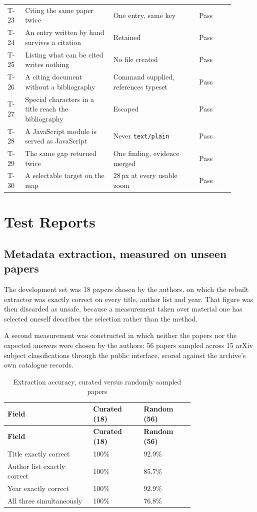 \documentclass[12pt,a4paper]{report}
\begin{document}
\begin{longtable}{@{}p{0.07\linewidth}p{0.35\linewidth}p{0.34\linewidth}p{0.14\linewidth}@{}}
T-23 & Citing the same paper twice & One entry, same key & Pass \\
T-24 & An entry written by hand survives a citation & Retained & Pass \\
T-25 & Listing what can be cited writes nothing & No file created & Pass \\
T-26 & A citing document without a bibliography & Command supplied, references
  typeset & Pass \\
T-27 & Special characters in a title reach the bibliography & Escaped & Pass \\
T-28 & A JavaScript module is served as JavaScript & Never
  \texttt{text/plain} & Pass \\
T-29 & The same gap returned twice & One finding, evidence merged & Pass \\
T-30 & A selectable target on the map & 28\,px at every usable zoom & Pass \\
\bottomrule
\end{longtable}

\section{Test Reports}

\subsection{Metadata extraction, measured on unseen papers}

The development set was 18 papers chosen by the authors, on which the rebuilt
extractor was exactly correct on every title, author list and year. That figure
was then discarded as unsafe, because a measurement taken over material one has
selected oneself describes the selection rather than the method.

A second measurement was constructed in which neither the papers nor the
expected answers were chosen by the authors: 56 papers sampled across 15 arXiv
subject classifications through the public interface, scored against the
archive's own catalogue records.

\begin{longtable}{@{}p{0.34\linewidth}p{0.20\linewidth}p{0.20\linewidth}@{}}
\caption{Extraction accuracy, curated versus randomly sampled papers}\label{tab:extraction}\\
\toprule
\textbf{Field} & \textbf{Curated (18)} & \textbf{Random (56)} \\
\midrule
\endfirsthead
\toprule
\textbf{Field} & \textbf{Curated (18)} & \textbf{Random (56)} \\
\midrule
\endhead

Title exactly correct        & 100\%  & 92.9\% \\
Author list exactly correct  & 100\%  & 85.7\% \\
Year exactly correct         & 100\%  & 92.9\% \\
All three simultaneously     & 100\%  & 76.8\% \\
\bottomrule
\end{longtable}
\end{document}
